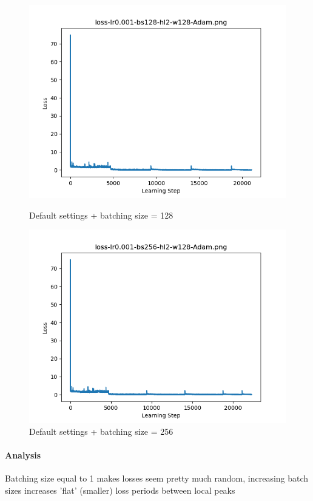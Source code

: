 \documentclass{article}[12pt]
\begin{document}
        \begin{figure}[H]
        \includegraphics[width=\linewidth]{testsResults/loss/bs/loss-lr0.001-bs128-hl2-w128-Adam.png}
        \caption{Default settings + batching size = 128}
        \endminipage
        \includegraphics[width=\linewidth]{testsResults/loss/bs/loss-lr0.001-bs256-hl2-w128-Adam.png}
        \caption{Default settings + batching size = 256}
        \endminipage
    \end{figure}

    \paragraph{Analysis} Batching size equal to 1 makes losses seem pretty much random, increasing batch sizes increases 'flat' (smaller) loss periods between local peaks
\end{document}
